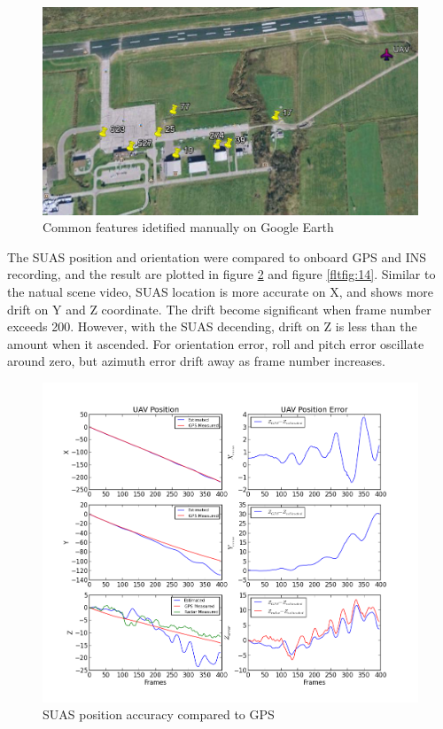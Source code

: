 \begin{figure}[h]
\centering
\includegraphics[width=13cm, keepaspectratio=true]
{./Figures/fltfig/airport/uav_and_identified_landmark.png}
\caption{Common features idetified manually on Google Earth }
\label{fltfig:12}
\end{figure}
\FloatBarrier

The SUAS position and orientation were compared to onboard GPS and INS
recording, and the result are plotted in figure \ref{fltfig:13} and
figure \ref{fltfig:14}. Similar to the natual scene video, SUAS
location is more accurate on X, and shows more drift on Y and Z
coordinate. The drift become significant when frame number exceeds
200. However, with the SUAS decending, drift on Z is less than the
amount when it ascended. For orientation error, roll and pitch error
oscillate around zero, but azimuth error drift away as frame number
increases.

\begin{figure}[h]
\centering
\includegraphics[width=13cm, keepaspectratio=true]
{./Figures/fltfig/airport/UAV_position_and_error.png}
\caption{SUAS position accuracy compared to GPS}
\label{fltfig:13}
\end{figure}

